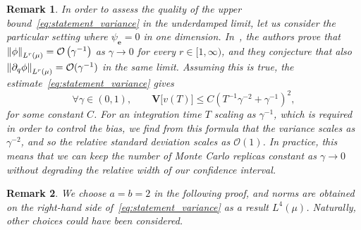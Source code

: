 \documentclass[11pt,a4paper]{article}
\newcommand{\var}[0]{\mathbf{V}}
\newcommand{\vect}[1]{\boldsymbol{\mathbf #1}}
\theoremstyle{plain}
\newtheorem{remark}{Remark}[section]
\numberwithin{equation}{section}
\renewcommand{\leq}{\leqslant}
\begin{document}
\begin{remark}
    In order to assess the quality of the upper bound~\eqref{eq:statement_variance} in the underdamped limit,
    let us consider the particular setting where $\psi_{\vect e} = 0$ in one dimension.
    In~\cite[Remark 6.10]{MR2394704},
    the authors prove that $\norm{\phi}[\lp{r}{\mu}] = \bigo{\gamma^{-1}}$ as $\gamma \to 0$ for every $r \in [1, \infty)$,
    and they conjecture that also $\norm{\partial_q \phi}[\lp{r}{\mu}] = \mathcal O(\gamma^{-1})$ in the same limit.
    Assuming this is true, the estimate~\eqref{eq:statement_variance} gives
    \begin{equation}
        \label{eq:variance_scaling}
        \forall \gamma \in (0, 1), \qquad
        \var \bigl[v(T)\bigr]
        \leq C \left( T^{-1} \gamma^{-2} + \gamma^{-1} \right)^2,
    \end{equation}
    for some constant $C$.
    For an integration time $T$ scaling as $\gamma^{-1}$,
    which is required in order to control the bias,
    we find from this formula that the variance scales as $\gamma^{-2}$,
    and so the relative standard deviation scales as $\mathcal O(1)$.
    In practice, this means that we can keep the number of Monte Carlo replicas constant as $\gamma \to 0$
    without degrading the relative width of our confidence interval.
\end{remark}
\begin{remark}
    We choose $a = b = 2$ in the following proof,
    and norms are obtained on the right-hand side of~\eqref{eq:statement_variance} as a result $L^4(\mu)$.
    Naturally, other choices could have been considered.
\end{remark}
\end{document}
